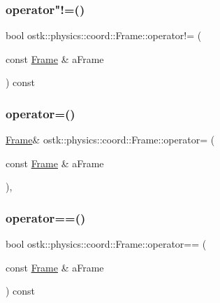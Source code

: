 \subsubsection{\texorpdfstring{operator"!=()}{operator!=()}}
{\footnotesize\ttfamily bool ostk\+::physics\+::coord\+::\+Frame\+::operator!= (\begin{DoxyParamCaption}\item[{const \hyperlink{classostk_1_1physics_1_1coord_1_1_frame}{Frame} \&}]{a\+Frame }\end{DoxyParamCaption}) const}

\mbox{\label{classostk_1_1physics_1_1coord_1_1_frame_ac47e4fe942c8cd0b8969ee9f6d32b816}} 
\subsubsection{\texorpdfstring{operator=()}{operator=()}}
{\footnotesize\ttfamily \hyperlink{classostk_1_1physics_1_1coord_1_1_frame}{Frame}\& ostk\+::physics\+::coord\+::\+Frame\+::operator= (\begin{DoxyParamCaption}\item[{const \hyperlink{classostk_1_1physics_1_1coord_1_1_frame}{Frame} \&}]{a\+Frame }\end{DoxyParamCaption})\hspace{0.3cm}{\ttfamily [protected]}, {\ttfamily [default]}}

\mbox{\label{classostk_1_1physics_1_1coord_1_1_frame_a010fbd30fe3a937d44d0fbbdeb60222b}} 
\subsubsection{\texorpdfstring{operator==()}{operator==()}}
{\footnotesize\ttfamily bool ostk\+::physics\+::coord\+::\+Frame\+::operator== (\begin{DoxyParamCaption}\item[{const \hyperlink{classostk_1_1physics_1_1coord_1_1_frame}{Frame} \&}]{a\+Frame }\end{DoxyParamCaption}) const}

